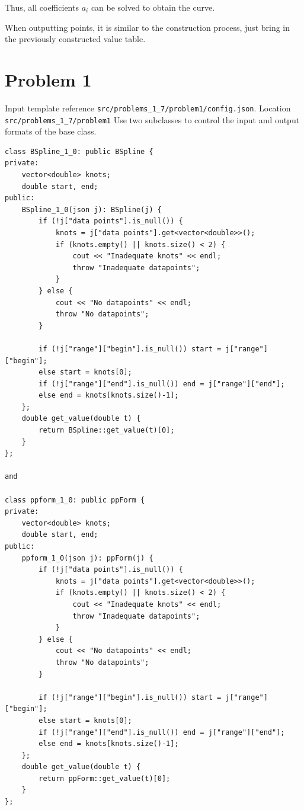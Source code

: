 \documentclass[a4paper]{article}
\begin{document}
Thus, all coefficients $a_i$ can be solved to obtain the curve.

When outputting points, it is similar to the construction process, just bring in the previously constructed value table.\\

\section*{Problem 1}
Input template reference \texttt{src/problems\_1\_7/problem1/config.json}.
Location \texttt{src/problems\_1\_7/problem1}
Use two subclasses to control the input and output formats of the base class.

\begin{verbatim}
class BSpline_1_0: public BSpline {
private:
    vector<double> knots; 
    double start, end;
public:
    BSpline_1_0(json j): BSpline(j) {
        if (!j["data points"].is_null()) {
            knots = j["data points"].get<vector<double>>();
            if (knots.empty() || knots.size() < 2) {
                cout << "Inadequate knots" << endl;
                throw "Inadequate datapoints";
            }
        } else {
            cout << "No datapoints" << endl;
            throw "No datapoints";
        }
        
        if (!j["range"]["begin"].is_null()) start = j["range"]["begin"];
        else start = knots[0];
        if (!j["range"]["end"].is_null()) end = j["range"]["end"];
        else end = knots[knots.size()-1];
    };
    double get_value(double t) {
        return BSpline::get_value(t)[0];
    }
};

and

class ppform_1_0: public ppForm {
private:
    vector<double> knots;
    double start, end;
public:
    ppform_1_0(json j): ppForm(j) {
        if (!j["data points"].is_null()) {
            knots = j["data points"].get<vector<double>>();
            if (knots.empty() || knots.size() < 2) {
                cout << "Inadequate knots" << endl;
                throw "Inadequate datapoints";
            }
        } else {
            cout << "No datapoints" << endl;
            throw "No datapoints";
        }
        
        if (!j["range"]["begin"].is_null()) start = j["range"]["begin"];
        else start = knots[0];
        if (!j["range"]["end"].is_null()) end = j["range"]["end"];
        else end = knots[knots.size()-1];
    };
    double get_value(double t) {
        return ppForm::get_value(t)[0];
    }
};
\end{verbatim}
\end{document}
